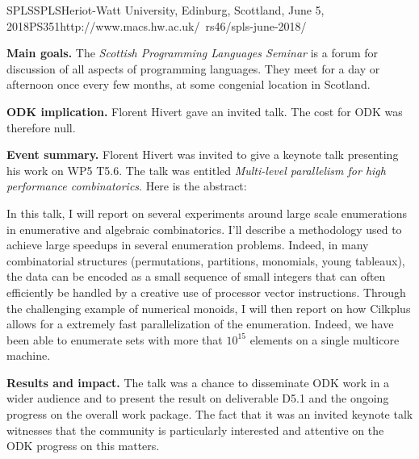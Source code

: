 \begin{event}{SPLS}{SPLS}{Heriot-Watt University, Edinburg, Scottland, June 5, 2018}{PS}{35}{1}{http://www.macs.hw.ac.uk/~rs46/spls-june-2018/}

\textbf{Main goals.}  The \emph{Scottish Programming Languages Seminar} is a
forum for discussion of all aspects of programming languages. They meet for a
day or afternoon once every few months, at some congenial location in
Scotland.

\textbf{ODK implication.} Florent Hivert gave an invited talk. The cost for
ODK was therefore null.

\textbf{Event summary.}  Florent Hivert was invited to give a keynote talk
presenting his work on WP5 T5.6. The talk was entitled \emph{ Multi-level
  parallelism for high performance combinatorics}. Here is the abstract:

In this talk, I will report on several experiments around large scale
enumerations in enumerative and algebraic combinatorics.  I'll describe a
methodology used to achieve large speedups in several enumeration
problems. Indeed, in many combinatorial structures (permutations, partitions,
monomials, young tableaux), the data can be encoded as a small sequence of
small integers that can often efficiently be handled by a creative use of
processor vector instructions. Through the challenging example of numerical
monoids, I will then report on how Cilkplus allows for a extremely fast
parallelization of the enumeration. Indeed, we have been able to enumerate
sets with more that $10^15$ elements on a single multicore machine.

\textbf{Results and impact.} The talk was a chance to disseminate ODK work in
a wider audience and to present the result on deliverable D5.1 and the ongoing
progress on the overall work package. The fact that it was an invited keynote
talk witnesses that the community is particularly interested and attentive on
the ODK progress on this matters.

\end{event}

